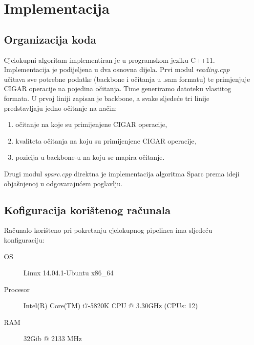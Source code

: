 \chapter{Implementacija}
\label{sec:implementacija}

\section{Organizacija koda}
Cjelokupni algoritam implementiran je u programskom jeziku C++11.
Implementacija je podijeljena u dva osnovna dijela.
Prvi modul \emph{reading.cpp} učitava sve potrebne podatke (backbone i očitanja u .sam formatu) te primjenjuje CIGAR operacije na pojedina očitanja.
Time generiramo datoteku vlastitog formata.
U prvoj liniji zapisan je backbone, a svake sljedeće tri linije predstavljaju jedno očitanje na način:
\begin{enumerate}
  \item očitanje na koje su primijenjene CIGAR operacije,
  \item kvaliteta očitanja na koju su primijenjene CIGAR operacije,
  \item pozicija u backbone-u na koju se mapira očitanje.
\end{enumerate}

Drugi modul \emph{sparc.cpp} direktna je implementacija algoritma Sparc prema ideji objašnjenoj u odgovarajućem poglavlju. 

\section{Kofiguracija korištenog računala}

Računalo korišteno pri pokretanju cjelokupnog pipelinea ima sljedeću konfiguraciju:
\begin{description}
  \item [OS] Linux 14.04.1-Ubuntu x86\_64
  \item [Procesor] Intel(R) Core(TM) i7-5820K CPU @ 3.30GHz (CPUs: 12)
  \item [RAM] 32Gib @ 2133 MHz
\end{description}


